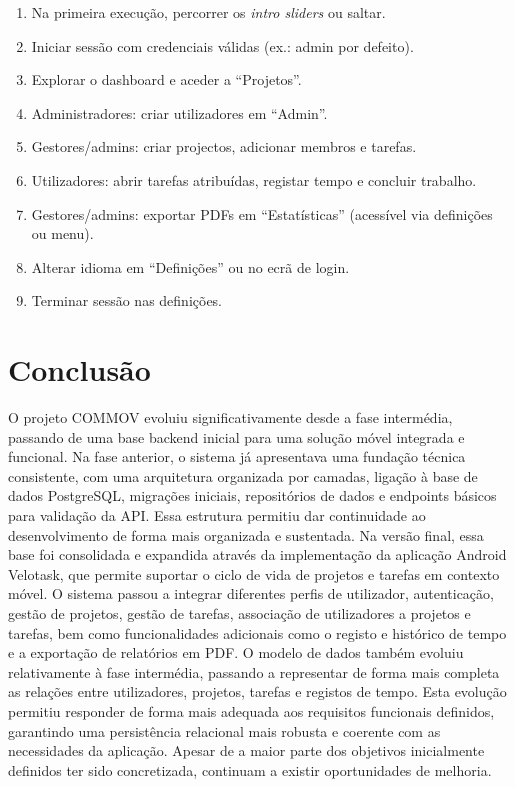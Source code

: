 \documentclass[12pt,a4paper]{article}
\begin{document}
\begin{enumerate}[leftmargin=*]
    \item Na primeira execução, percorrer os \textit{intro sliders} ou saltar.
    \item Iniciar sessão com credenciais válidas (ex.: admin por defeito).
    \item Explorar o dashboard e aceder a ``Projetos''.
    \item Administradores: criar utilizadores em ``Admin''.
    \item Gestores/admins: criar projectos, adicionar membros e tarefas.
    \item Utilizadores: abrir tarefas atribuídas, registar tempo e concluir trabalho.
    \item Gestores/admins: exportar PDFs em ``Estatísticas'' (acessível via definições ou menu).
    \item Alterar idioma em ``Definições'' ou no ecrã de login.
    \item Terminar sessão nas definições.
\end{enumerate}


\section{Conclusão}

O projeto COMMOV evoluiu significativamente desde a fase intermédia, passando de uma base backend inicial para uma solução móvel integrada e funcional. Na fase anterior, o sistema já apresentava uma fundação técnica consistente, com uma arquitetura organizada por camadas, ligação à base de dados PostgreSQL, migrações iniciais, repositórios de dados e endpoints básicos para validação da API. Essa estrutura permitiu dar continuidade ao desenvolvimento de forma mais organizada e sustentada.
Na versão final, essa base foi consolidada e expandida através da implementação da aplicação Android Velotask, que permite suportar o ciclo de vida de projetos e tarefas em contexto móvel. O sistema passou a integrar diferentes perfis de utilizador, autenticação, gestão de projetos, gestão de tarefas, associação de utilizadores a projetos e tarefas, bem como funcionalidades adicionais como o registo e histórico de tempo e a exportação de relatórios em PDF.
O modelo de dados também evoluiu relativamente à fase intermédia, passando a representar de forma mais completa as relações entre utilizadores, projetos, tarefas e registos de tempo. Esta evolução permitiu responder de forma mais adequada aos requisitos funcionais definidos, garantindo uma persistência relacional mais robusta e coerente com as necessidades da aplicação.
Apesar de a maior parte dos objetivos inicialmente definidos ter sido concretizada, continuam a existir oportunidades de melhoria.
\end{document}
